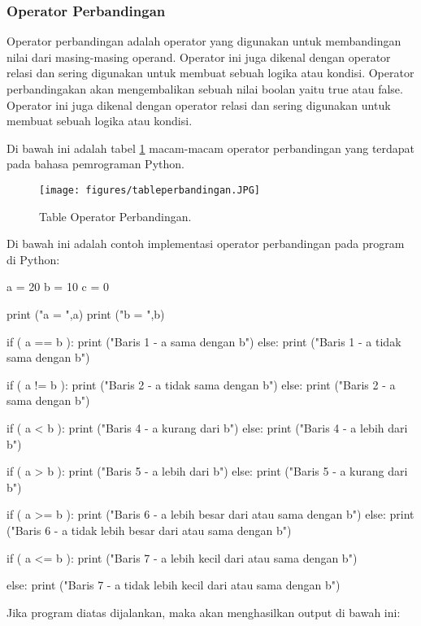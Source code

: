 \begin{eqation}
\subsubsection{Operator Perbandingan}
Operator perbandingan adalah operator yang digunakan untuk membandingan nilai dari masing-masing operand. Operator ini juga dikenal dengan operator relasi dan sering digunakan untuk membuat sebuah logika atau kondisi. Operator perbandingakan akan mengembalikan sebuah nilai boolan yaitu true atau false. Operator ini juga dikenal dengan operator relasi dan sering digunakan untuk membuat sebuah logika atau kondisi.

Di bawah ini adalah tabel \ref{tableperbandingan} macam-macam operator perbandingan yang terdapat pada bahasa pemrograman Python.
\begin{figure}[ht]
	\centerline{\texttt{[image: figures/tableperbandingan.JPG]}}
	\caption{Table Operator Perbandingan.}
	\label{tableperbandingan}
\end{figure}

Di bawah ini adalah contoh implementasi operator perbandingan pada program di Python:

a = 20
b = 10
c = 0

\begin{verbartim}
print ("a = ",a)
print ("b = ",b)

if ( a == b ):
   print ("Baris 1 - a sama dengan b")
else:
   print ("Baris 1 - a tidak sama dengan b")

if ( a != b ):
   print ("Baris 2 - a tidak sama dengan b")
else:
   print ("Baris 2 - a sama dengan b")

if ( a < b ):
   print ("Baris 4 - a kurang dari b") 
else:
   print ("Baris 4 - a lebih dari b")

if ( a > b ):
   print ("Baris 5 - a lebih dari b") 
else:
   print ("Baris 5 - a kurang dari b")

if ( a >= b ):
   print ("Baris 6 - a lebih besar dari atau sama dengan b") 
else:
   print ("Baris 6 - a tidak lebih besar dari atau sama dengan b") 

if ( a <= b ):
   print ("Baris 7 - a lebih kecil dari atau sama dengan b") 

else:
   print ("Baris 7 - a tidak lebih kecil dari atau sama dengan b")    
   
\end{verbartim}

Jika program diatas dijalankan, maka akan menghasilkan output di bawah ini:


\end{eqation}
